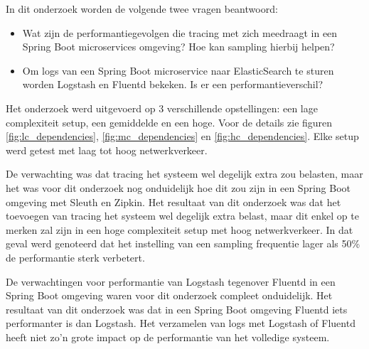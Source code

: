 In dit onderzoek worden de volgende twee vragen beantwoord:
\begin{itemize}
\item Wat zijn de performantiegevolgen die tracing met zich meedraagt in een Spring Boot microservices omgeving? Hoe kan sampling hierbij helpen?
\item Om logs van een Spring Boot microservice naar ElasticSearch te sturen worden Logstash en Fluentd bekeken. Is er een performantieverschil?
\end{itemize}

Het onderzoek werd uitgevoerd op 3 verschillende opstellingen: een lage complexiteit setup, een gemiddelde en een hoge. Voor de details zie figuren \ref{fig:lc_dependencies}, \ref{fig:mc_dependencies} en \ref{fig:hc_dependencies}. Elke setup werd getest met laag tot hoog netwerkverkeer.

De verwachting was dat tracing het systeem wel degelijk extra zou belasten, maar het was voor dit onderzoek nog onduidelijk hoe dit zou zijn in een Spring Boot omgeving met Sleuth en Zipkin. Het resultaat van dit onderzoek was dat het toevoegen van tracing het systeem wel degelijk extra belast, maar dit enkel op te merken zal zijn in een hoge complexiteit setup met hoog netwerkverkeer. In dat geval werd genoteerd dat het instelling van een sampling frequentie lager als 50\% de performantie sterk verbetert.

De verwachtingen voor performantie van Logstash tegenover Fluentd in een Spring Boot omgeving waren voor dit onderzoek compleet onduidelijk. Het resultaat van dit onderzoek was dat in een Spring Boot omgeving Fluentd iets performanter is dan Logstash. Het verzamelen van logs met Logstash of Fluentd heeft niet zo'n grote impact op de performantie van het volledige systeem.


